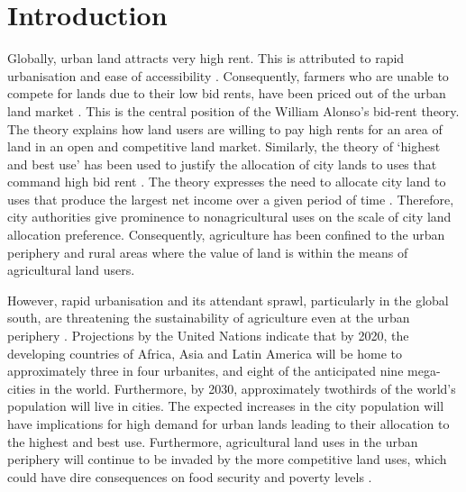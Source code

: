 \chapter{Introduction} %

\label{Chapter:Introduction}

Globally, urban land attracts very high rent. This is attributed to rapid urbanisation and ease of accessibility \cite{Trussell2010}. Consequently, farmers who are unable to compete for lands due to their low bid rents, have been priced out of the urban land market \cite{Amponsah2015, Amponsah2016, Keraita2008, Owusu2012}. This is the central position of the William Alonso's bid-rent theory. The theory explains how land users are willing to pay high rents for an area of land in an open and competitive land market. Similarly, the theory of ‘highest and best use’ has been used to justify the allocation of city lands to uses that command high bid rent \cite{Scholz1933, Barkley1986, Fisher1954}. The theory expresses the need to allocate city land to uses that produce the largest net income over a given period of time \cite{Fisher1954}. Therefore, city authorities give prominence to nonagricultural uses on the scale of city land allocation preference. Consequently, agriculture has been confined to the urban periphery and rural areas where the value of land is within the means of agricultural land users.

However, rapid urbanisation and its attendant sprawl, particularly in the global south, are threatening the sustainability of agriculture even at the urban periphery \cite{Amponsah2015, Liu2017}. Projections by the United Nations indicate that by 2020, the developing countries of Africa, Asia and Latin America will be home to approximately three in four urbanites, and eight of the anticipated nine mega-cities in the world. Furthermore, by 2030, approximately twothirds of the world's population will live in cities. The expected increases in the city population will have implications for high demand for urban lands leading to their allocation to the highest and best use. Furthermore, agricultural land uses in the urban periphery will continue to be invaded by the more competitive land uses, which could have dire consequences on food security and poverty levels \cite{Hoornweg2012}.

